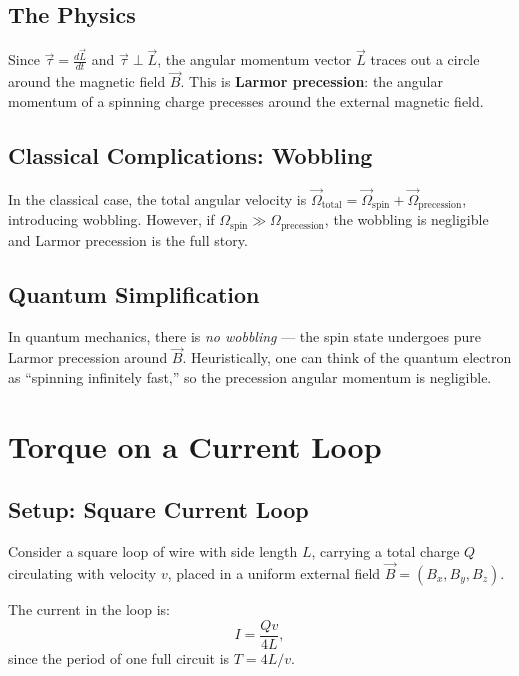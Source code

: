 \documentclass[11pt,a4paper]{article}
\theoremstyle{definition}
\theoremstyle{plain}
\theoremstyle{remark}
\begin{document}
\subsection{The Physics}

Since $\vec{\tau} = \frac{d\vec{L}}{dt}$ and $\vec{\tau} \perp \vec{L}$, the angular momentum vector $\vec{L}$ traces out a circle around the magnetic field $\vec{B}$. This is \textbf{Larmor precession}: the angular momentum of a spinning charge precesses around the external magnetic field.

\subsection{Classical Complications: Wobbling}

In the classical case, the total angular velocity is $\vec{\Omega}_{\text{total}} = \vec{\Omega}_{\text{spin}} + \vec{\Omega}_{\text{precession}}$, introducing wobbling. However, if $\Omega_{\text{spin}} \gg \Omega_{\text{precession}}$, the wobbling is negligible and Larmor precession is the full story.

\subsection{Quantum Simplification}

In quantum mechanics, there is \emph{no wobbling} --- the spin state undergoes pure Larmor precession around $\vec{B}$. Heuristically, one can think of the quantum electron as ``spinning infinitely fast,'' so the precession angular momentum is negligible.

\section{Torque on a Current Loop}

\subsection{Setup: Square Current Loop}

Consider a square loop of wire with side length $L$, carrying a total charge $Q$ circulating with velocity $v$, placed in a uniform external field $\vec{B} = (B_x, B_y, B_z)$.

The current in the loop is:
\[
    I = \frac{Qv}{4L},
\]
since the period of one full circuit is $T = 4L/v$.
\end{document}
